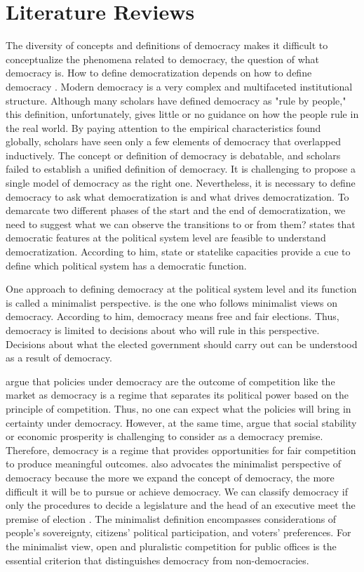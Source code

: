 \documentclass[11pt]{article}
\begin{document}
\section*{Literature Reviews}	

The diversity of concepts and definitions of democracy makes it difficult to conceptualize the phenomena related to democracy, the question of what democracy is. How to define democratization depends on how to define democracy \citep[797]{Treisman2020}. Modern democracy is a very complex and multifaceted institutional structure. Although many scholars have defined democracy as "rule by people," this definition, unfortunately, gives little or no guidance on how the people rule in the real world. By paying attention to the empirical characteristics found globally, scholars have seen only a few elements of democracy that overlapped inductively. The concept or definition of democracy is debatable, and scholars failed to establish a unified definition of democracy. It is challenging to propose a single model of democracy as the right one. Nevertheless, it is necessary to define democracy to ask what democratization is and what drives democratization. To demarcate two different phases of the start and the end of democratization, we need to suggest what we can observe the transitions to or from them? \citet[44]{Warren2017} states that democratic features at the political system level are feasible to understand democratization. According to him,  state or statelike capacities provide a cue to define which political system has a democratic function.

One approach to defining democracy at the political system level and its function is called a minimalist perspective. \citet{Schumpeter1954} is the one who follows minimalist views on democracy. According to him, democracy means free and fair elections. Thus, democracy is limited to decisions about who will rule in this perspective. Decisions about what the elected government should carry out can be understood as a result of democracy.

\citet{przeworski2000} argue that policies under democracy are the outcome of competition like the market as democracy is a regime that separates its political power based on the principle of competition. Thus, no one can expect what the policies will bring in certainty under democracy. However, at the same time, \citet{przeworski2000} argue that social stability or economic prosperity is challenging to consider as a democracy premise. Therefore, democracy is a regime that provides opportunities for fair competition to produce meaningful outcomes. \citet{przeworski2000} also advocates the minimalist perspective of democracy because the more we expand the concept of democracy, the more difficult it will be to pursue or achieve democracy. We can classify democracy if only the procedures to decide a legislature and the head of an executive meet the premise of election \citep{przeworski2000}. The minimalist definition encompasses considerations of people's sovereignty, citizens' political participation, and voters' preferences. For the minimalist view, open and pluralistic competition for public offices is the essential criterion that distinguishes democracy from non-democracies.
\end{document}
